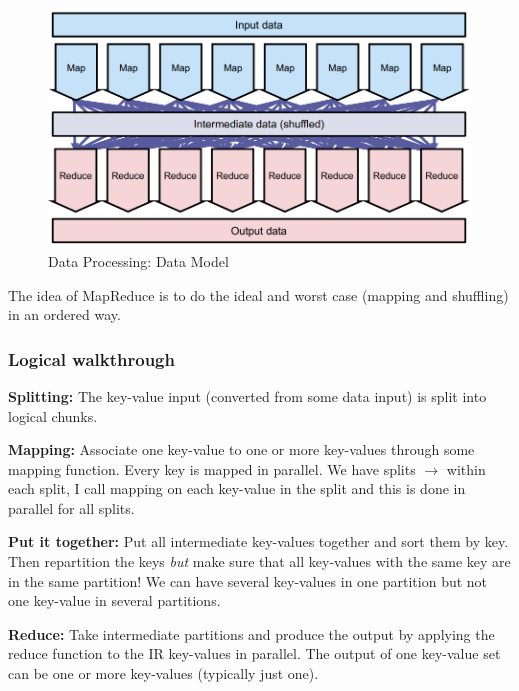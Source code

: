 \documentclass[11pt,oneside,a4paper]{article}
\begin{document}
\begin{figure}[hb!]
	\centering
	\includegraphics[width=0.5\linewidth]{figures/mr_datamodel}
	\caption{Data Processing: Data Model}
	\label{fig:mrdatamodel}
\end{figure}


The idea of MapReduce is to do the ideal and worst case (mapping and shuffling) in an ordered way.\\

\subsubsection{Logical walkthrough}

\begin{compactenum}
	\item \textbf{Splitting:} The key-value input (converted from some data input) is split into logical chunks.
	\item \textbf{Mapping:} Associate one key-value to one or more key-values through some mapping function. Every key is mapped in parallel. We have splits $\rightarrow$ within each split, I call mapping on each key-value in the split and this is done in parallel for all splits.
	\item \textbf{Put it together:} Put all intermediate key-values together and sort them by key. Then repartition the keys \textit{but} make sure that all key-values with the same key are in the same partition! We can have several key-values in one partition but not one key-value in several partitions.
	\item \textbf{Reduce:} Take intermediate partitions and produce the output by applying the reduce function to the IR key-values in parallel. The output of one key-value set can be one or more key-values (typically just one).
\end{compactenum}
\end{document}
